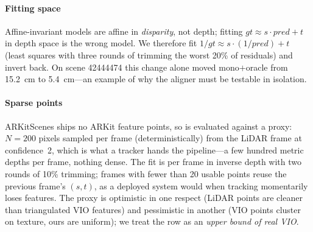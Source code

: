 \paragraph{Fitting space} Affine-invariant models are affine in \emph{disparity}, not depth; fitting
$gt \approx s\cdot pred + t$ in depth space is the wrong model. We therefore fit $1/gt \approx s\cdot(1/pred) + t$
(least squares with three rounds of trimming the worst 20\% of residuals) and invert back. On scene 42444474 this
change alone moved mono$+$oracle from \SI{15.2}{cm} to \SI{5.4}{cm}---an example of why the aligner must be testable in
isolation.

\paragraph{Sparse points} ARKitScenes ships no ARKit feature points, so  is evaluated against a
proxy: $N{=}200$ pixels sampled per frame (deterministically) from the LiDAR frame at confidence~2, which is what a
tracker hands the pipeline---a few hundred metric depths per frame, nothing dense. The fit is per frame in inverse
depth with two rounds of 10\% trimming; frames with fewer than 20 usable points reuse the previous frame's $(s,t)$,
as a deployed system would when tracking momentarily loses features. The proxy is optimistic in one respect (LiDAR
points are cleaner than triangulated VIO features) and pessimistic in another (VIO points cluster on texture, ours are
uniform); we treat the row as an \emph{upper bound of real VIO}.

